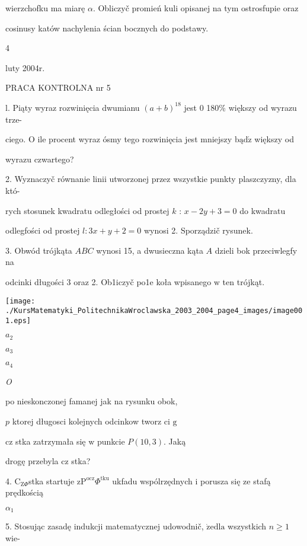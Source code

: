 \documentclass[a4paper,12pt]{article}
\begin{document}
wierzchofku ma miarę $\alpha$. Obliczyč promień kuli opisanej na tym ostrosfupie oraz

cosinusy katów nachylenia ścian bocznych do podstawy.

4





luty 2004r.

PRACA KONTROLNA nr 5

l. Piąty wyraz rozwinięcia dwumianu $(a+b)^{18}$ jest $0$ 180\% większy od wyrazu trze-

ciego. $\mathrm{O}$ ile procent wyraz ósmy tego rozwinięcia jest mniejszy $\mathrm{b}\text{ą} \mathrm{d}\acute{\mathrm{z}}$ większy od

wyrazu czwartego?

2. Wyznaczyč równanie linii utworzonej przez wszystkie punkty plaszczyzny, dla któ-

rych stosunek kwadratu odległości od prostej $k$ : $x-2y+3 = 0$ do kwadratu

odlegfości od prostej $l:3x+y+2=0$ wynosi 2. Sporządzič rysunek.

3. Obwód trójkąta $ABC$ wynosi 15, a dwusieczna kąta $A$ dzieli bok przeciwlegfy na

odcinki długości 3 oraz 2. Ob1iczyč po1e koła wpisanego $\mathrm{w}$ ten trójkąt.
\begin{center}
\texttt{[image: ./KursMatematyki\_PolitechnikaWroclawska\_2003\_2004\_page4\_images/image001.eps]}
\end{center}
$a_{2}$

$a_{3}$

$a_{4}$

{\it O}

po nieskonczonej famanej jak na rysunku obok,

$p$ ktorej długosci kolejnych odcinkow tworz ci $\mathrm{g}$

cz stka zatrzymała się $\mathrm{w}$ punkcie $P(10,3)$. Jaką

drogę przebyla cz stka?

4. $\mathrm{C}_{\mathrm{Z}\Phi}$stka startuje $\mathrm{z}\mathrm{P}^{\mathrm{o}\mathrm{c}\mathrm{z}}\Phi^{\mathrm{t}\mathrm{k}\mathrm{u}}$ ukfadu wspólrzędnych $\mathrm{i}$ porusza się ze stafą prędkością

$\alpha_{1}$

5. Stosując zasadę indukcji matematycznej udowodnič, $\dot{\mathrm{z}}\mathrm{e}\mathrm{d}\mathrm{l}\mathrm{a}$ wszystkich $n\geq 1$ wie-
\end{document}
